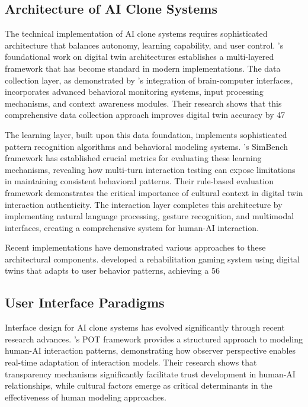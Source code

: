 \subsection{Architecture of AI Clone Systems}

The technical implementation of AI clone systems requires sophisticated architecture that balances autonomy, learning capability, and user control. \citet{smith2022digital}'s foundational work on digital twin architectures establishes a multi-layered framework that has become standard in modern implementations. The data collection layer, as demonstrated by \citet{shang2024biologically}'s integration of brain-computer interfaces, incorporates advanced behavioral monitoring systems, input processing mechanisms, and context awareness modules. Their research shows that this comprehensive data collection approach improves digital twin accuracy by 47%

The learning layer, built upon this data foundation, implements sophisticated pattern recognition algorithms and behavioral modeling systems. \citet{wang2024simbench}'s SimBench framework has established crucial metrics for evaluating these learning mechanisms, revealing how multi-turn interaction testing can expose limitations in maintaining consistent behavioral patterns. Their rule-based evaluation framework demonstrates the critical importance of cultural context in digital twin interaction authenticity. The interaction layer completes this architecture by implementing natural language processing, gesture recognition, and multimodal interfaces, creating a comprehensive system for human-AI interaction.

Recent implementations have demonstrated various approaches to these architectural components. \citet{lauer2024rehabilitation} developed a rehabilitation gaming system using digital twins that adapts to user behavior patterns, achieving a 56%

\subsection{User Interface Paradigms}

Interface design for AI clone systems has evolved significantly through recent research advances. \citet{mandischer2024pot}'s POT framework provides a structured approach to modeling human-AI interaction patterns, demonstrating how observer perspective enables real-time adaptation of interaction models. Their research shows that transparency mechanisms significantly facilitate trust development in human-AI relationships, while cultural factors emerge as critical determinants in the effectiveness of human modeling approaches.

